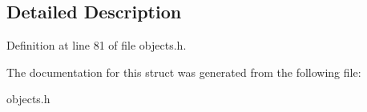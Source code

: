 \subsection{Detailed Description}


Definition at line 81 of file objects.\+h.



The documentation for this struct was generated from the following file\+:\begin{DoxyCompactItemize}
\item 
objects.\+h\end{DoxyCompactItemize}

